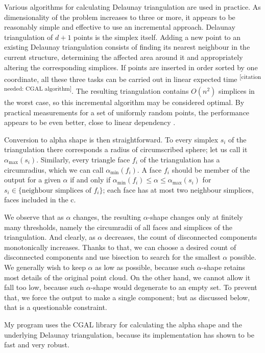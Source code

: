 \documentclass[12pt]{article}
\begin{document}
Various algorithms for calculating Delaunay triangulation are used in practice. As dimensionality of the problem increases to three or more, it appears to be reasonably simple and effective to use an incremental approach. Delaunay triangulation of $d+1$ points is the simplex itself. Adding a new point to an existing Delaunay triangulation consists of finding its nearest neighbour in the current structure, determining the affected area around it and appropriately altering the corresponding simplices. If points are inserted in order sorted by one coordinate, all these three tasks can be carried out in linear expected time \textsuperscript{[citation needed: CGAL algorithm]}. The resulting triangulation contains $O(n^2)$ simplices in the worst case, so this incremental algorithm may be considered optimal. By practical measurements for a set of uniformly random points, the performance appears to be even better, close to linear dependency \cite[p.~439--458]{liu02}.

Conversion to alpha shape is then straightforward. To every simplex $s_i$ of the triangulation there corresponds a radius of circumscribed sphere; let us call it $\alpha_{\max}(s_i)$. Similarly, every triangle face $f_i$ of the triangulation has a circumradius, which we can call $\alpha_{\min}(f_i)$. A face $f_i$ should be member of the output for a given $\alpha$ if and only if $\alpha_{\min}(f_i) \le \alpha \le \alpha_{\max}(s_i)$ for $s_i \in \{\text{neighbour simplices of }f_i\}$; each face has at most two neighbour simplices, faces included in the c.

We observe that as $\alpha$ changes, the resulting $\alpha$-shape changes only at finitely many thresholds, namely the circumradii of all faces and simplices of the triangulation. And clearly, as $\alpha$ decreases, the count of disconnected components monotonically increases. Thanks to that, we can choose a desired count of disconnected components and use bisection to search for the smallest $\alpha$ possible. We generally wish to keep $\alpha$ as low as possible, because such $\alpha$-shape retains most details of the original point cloud. On the other hand, we cannot allow it fall too low, because such $\alpha$-shape would degenerate to an empty set. To prevent that, we force the output to make a single component; but as discussed below, that is a questionable constraint.

My program uses the CGAL library \cite{cgal} for calculating the alpha shape and the underlying Delaunay triangulation, because its implementation has shown to be fast and very robust.
\end{document}

